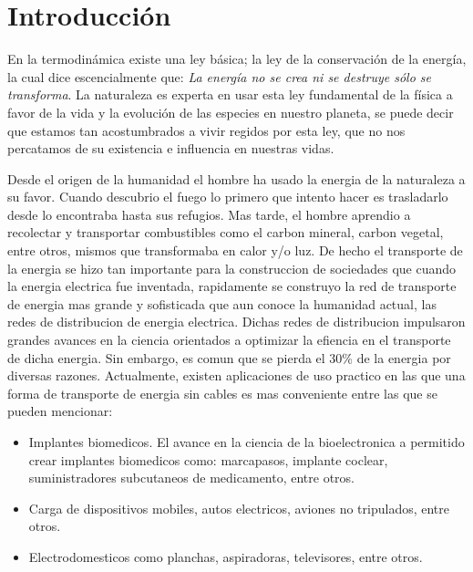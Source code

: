 \documentclass{intech}
\affiliation{Universidad Veracruzana \\ Facultad de Instrumentaci\'on Electr\'onica}
\begin{document}
\maketitle

\section{Introducci\'on}


En la termodin\'amica existe una ley b\'asica; la ley de la conservaci\'on de la energ{\'i}a, la cual dice escencialmente que: {\it La energ{\'i}a no se crea ni se destruye s\'olo se transforma}. La naturaleza es experta en usar esta ley fundamental de la f{\'i}sica a favor
de la vida y la evoluci\'on de las especies en nuestro planeta, se puede decir que estamos tan acostumbrados a 
vivir regidos por esta ley, que no nos percatamos de su existencia e influencia en nuestras vidas. 

Desde el origen de la humanidad el hombre ha usado la energia de la naturaleza a su favor. Cuando
descubrio el fuego lo primero que intento hacer es trasladarlo desde lo encontraba hasta sus refugios.
Mas tarde, el hombre aprendio a recolectar y transportar combustibles  como el carbon mineral, carbon vegetal, entre otros, mismos que transformaba en calor y/o luz. De hecho el transporte de la energia se hizo tan
importante para la construccion de sociedades que cuando la energia electrica fue inventada, rapidamente
se construyo la red de transporte de energia mas grande y sofisticada que aun conoce la humanidad actual, las redes de distribucion de energia electrica. Dichas redes de distribucion impulsaron grandes avances en la ciencia orientados
a optimizar la efiencia en el transporte de dicha energia. Sin embargo, es comun que se pierda el 30\%
de la energia por diversas razones. Actualmente, existen aplicaciones de uso practico en las que una forma de transporte de energia sin cables es mas conveniente entre las que se pueden mencionar:

\begin{itemize}
\item Implantes biomedicos. El avance en la ciencia de la bioelectronica a permitido
crear implantes biomedicos como: marcapasos, implante coclear, suministradores subcutaneos de medicamento, entre otros.
\item Carga de dispositivos mobiles, autos electricos, aviones no tripulados, entre otros.
\item Electrodomesticos como planchas, aspiradoras, televisores, entre otros.
\end{itemize}
\end{document}

